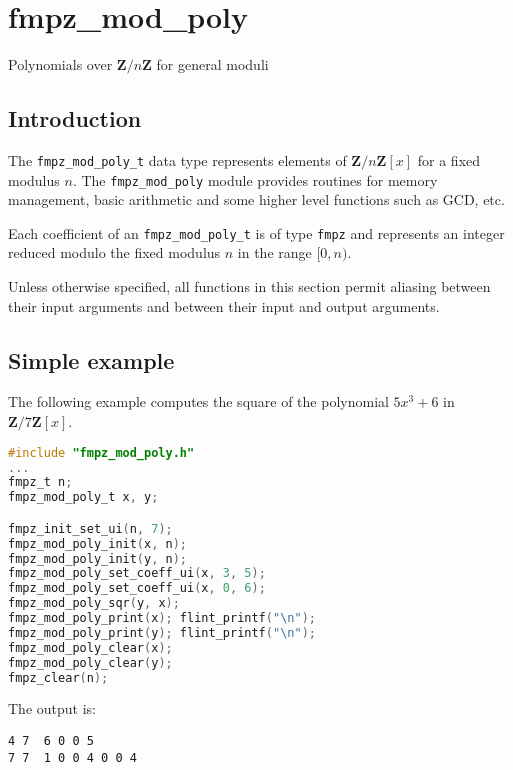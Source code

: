 \documentclass[a4paper,10pt]{book}
\newcommand{\Z}{\mathbf{Z}}%
\newcommand{\code}{\lstinline}
\begin{document}
{{


\chapter{fmpz\_mod\_poly}
\epigraph{Polynomials over $\Z / n \Z$ for general moduli}{}

\section{Introduction}

The \code{fmpz_mod_poly_t} data type represents elements of $\Z/n\Z[x]$ for
a fixed modulus $n$. The \code{fmpz_mod_poly} module provides routines for
memory management, basic arithmetic and some higher level functions
such as GCD, etc.

Each coefficient of an \code{fmpz_mod_poly_t} is of type \code{fmpz}
and represents an integer reduced modulo the fixed modulus $n$ in the
range $[0,n)$.

Unless otherwise specified, all functions in this section permit aliasing
between their input arguments and between their input and output arguments.

\section{Simple example}

The following example computes the square of the polynomial $5x^3 + 6$
in $\Z/7\Z[x]$.
\begin{lstlisting}[language=c]
#include "fmpz_mod_poly.h"
...
fmpz_t n;
fmpz_mod_poly_t x, y;

fmpz_init_set_ui(n, 7);
fmpz_mod_poly_init(x, n);
fmpz_mod_poly_init(y, n);
fmpz_mod_poly_set_coeff_ui(x, 3, 5);
fmpz_mod_poly_set_coeff_ui(x, 0, 6);
fmpz_mod_poly_sqr(y, x);
fmpz_mod_poly_print(x); flint_printf("\n");
fmpz_mod_poly_print(y); flint_printf("\n");
fmpz_mod_poly_clear(x);
fmpz_mod_poly_clear(y);
fmpz_clear(n);
\end{lstlisting}

The output is:
\begin{lstlisting}
4 7  6 0 0 5
7 7  1 0 0 4 0 0 4
\end{lstlisting}

}}
\end{document}
